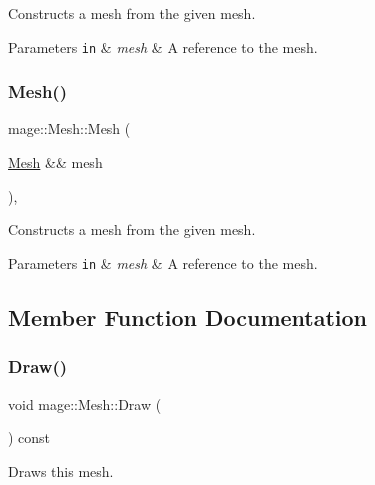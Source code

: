 Constructs a mesh from the given mesh.


\begin{DoxyParams}[1]{Parameters}
\mbox{\tt in}  & {\em mesh} & A reference to the mesh. \\
\hline
\end{DoxyParams}
\hypertarget{classmage_1_1_mesh_ab2c1131c72dc9a8c765257f27a304112}{}\label{classmage_1_1_mesh_ab2c1131c72dc9a8c765257f27a304112} 
\subsubsection{\texorpdfstring{Mesh()}{Mesh()}\hspace{0.1cm}{\footnotesize\ttfamily [3/3]}}
{\footnotesize\ttfamily mage\+::\+Mesh\+::\+Mesh (\begin{DoxyParamCaption}\item[{\hyperlink{classmage_1_1_mesh}{Mesh} \&\&}]{mesh }\end{DoxyParamCaption})\hspace{0.3cm}{\ttfamily [protected]}, {\ttfamily [default]}}

Constructs a mesh from the given mesh.


\begin{DoxyParams}[1]{Parameters}
\mbox{\tt in}  & {\em mesh} & A reference to the mesh. \\
\hline
\end{DoxyParams}


\subsection{Member Function Documentation}
\hypertarget{classmage_1_1_mesh_a62f7b8176f7747f2b4db7674524a146c}{}\label{classmage_1_1_mesh_a62f7b8176f7747f2b4db7674524a146c} 
\subsubsection{\texorpdfstring{Draw()}{Draw()}\hspace{0.1cm}{\footnotesize\ttfamily [1/2]}}
{\footnotesize\ttfamily void mage\+::\+Mesh\+::\+Draw (\begin{DoxyParamCaption}{ }\end{DoxyParamCaption}) const}

Draws this mesh. \hypertarget{classmage_1_1_mesh_ae1f71bddbb1fa3b45cec55f0fe920c7d}{}\label{classmage_1_1_mesh_ae1f71bddbb1fa3b45cec55f0fe920c7d} 
